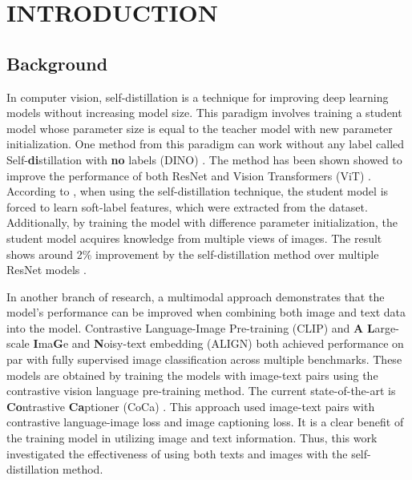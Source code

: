 \setlength{\parindent}{0in} 
\setlength{\parskip}{1.5mm}
\setlength{\baselineskip}{1.6em}

\chapter{INTRODUCTION}
\section{Background}

In computer vision, self-distillation  is a technique for improving deep learning models without increasing model size.
This paradigm involves training a student model whose parameter size is equal to the teacher model with new parameter initialization. 
One method from this paradigm can work without any label called Self-\textbf{di}stillation with \textbf{no} labels (DINO) .
The method has been shown showed to improve the performance of both ResNet  and Vision Transformers (ViT) . 
According to , when using the self-distillation technique, the student model is forced to learn soft-label features, which were extracted from the dataset. Additionally, by training the model with difference parameter initialization, the student model acquires knowledge from multiple views of images. The result shows around 2\% improvement by the self-distillation method over multiple ResNet models .

In another branch of research, a multimodal approach demonstrates that the model's performance can be improved when combining both image and text data into the model. 
Contrastive Language-Image Pre-training (CLIP)  and \textbf{A} \textbf{L}arge-scale \textbf{I}ma\textbf{G}e and \textbf{N}oisy-text embedding (ALIGN)  both achieved performance on par with fully supervised image classification across multiple benchmarks. 
These models are obtained by training the models with image-text pairs using the contrastive vision language pre-training method. 
The current state-of-the-art is \textbf{Co}ntrastive \textbf{Ca}ptioner (CoCa) .
This approach used image-text pairs with contrastive language-image loss and image captioning loss.
It is a clear benefit of the training model in utilizing image and text information. 
Thus, this work investigated the effectiveness of using both texts and images with the self-distillation method.

